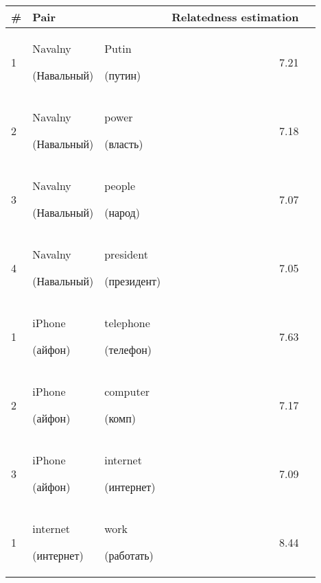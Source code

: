\documentclass[11pt,letterpaper]{article}
\begin{document}
\begin{table*}[t]
\begin{center}
\begin{tabular}{|l|ll|r|r|}
\hline \bf \# & \bf Pair &  & Relatedness estimation  \\ \hline
1 & Navalny \begin{russian}(Навальный)\end{russian} & Putin \begin{russian}(путин)\end{russian} & 7.21 \\
2 & Navalny  \begin{russian}(Навальный)\end{russian} & power \begin{russian}(власть)\end{russian} & 7.18 \\
3 & Navalny  \begin{russian}(Навальный)\end{russian} & people \begin{russian}(народ)\end{russian} & 7.07 \\
4 & Navalny  \begin{russian}(Навальный)\end{russian} & president \begin{russian}(президент)\end{russian} & 7.05 \\
\hline
1 & iPhone  \begin{russian}(айфон)\end{russian} & telephone \begin{russian}(телефон)\end{russian} & 7.63 \\
2 & iPhone  \begin{russian}(айфон)\end{russian} & computer \begin{russian}(комп)\end{russian} & 7.17 \\
3 & iPhone  \begin{russian}(айфон)\end{russian} & internet \begin{russian}(интернет)\end{russian} & 7.09 \\
\hline
1 & internet  \begin{russian}(интернет)\end{russian} & work \begin{russian}(работать)\end{russian} & 8.44 \\

\end{tabular}
\end{center}
\end{table*}
\end{document}
